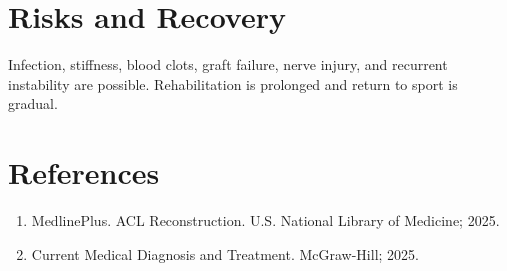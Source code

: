 \section*{Risks and Recovery}
Infection, stiffness, blood clots, graft failure, nerve injury, and recurrent instability are possible. Rehabilitation is prolonged and return to sport is gradual.
\section*{References}
\begin{enumerate}\item MedlinePlus. ACL Reconstruction. U.S. National Library of Medicine; 2025.\item Current Medical Diagnosis and Treatment. McGraw-Hill; 2025.\end{enumerate}
\clearpage
